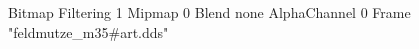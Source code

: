 {Bitmap
	{Filtering 1}
	{Mipmap 0}
	{Blend none}
	{AlphaChannel 0}
	{Frame "feldmutze_m35#art.dds"}
}
